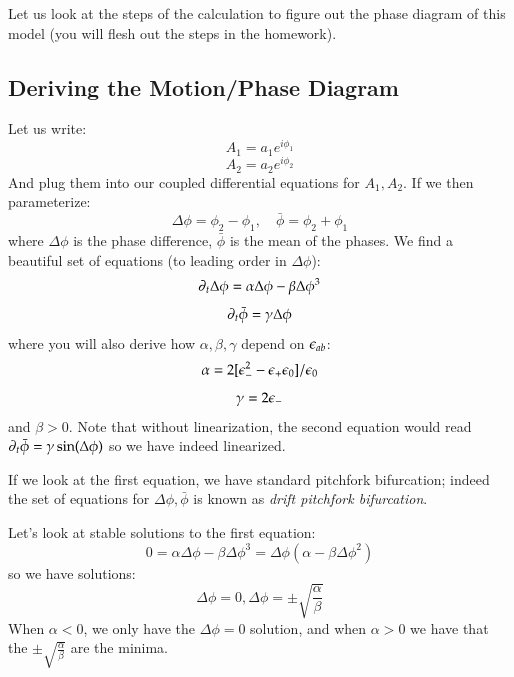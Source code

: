 Let us look at the steps of the calculation to figure out the phase diagram of this model (you will flesh out the steps in the homework).

\subsection{Deriving the Motion/Phase Diagram}
Let us write:
\begin{equation}
    A_1 = a_1e^{i\phi_1}
\end{equation}
\begin{equation}
    A_2 = a_2e^{i\phi_2}
\end{equation}
And plug them into our coupled differential equations for $A_1, A_2$. If we then parameterize:
\begin{equation}
    \Delta \phi = \phi_2 - \phi_1,\quad \bar{\phi} = \phi_2 + \phi_1
\end{equation}
where $\Delta \phi$ is the phase difference, $\bar{\phi}$ is the mean of the phases. We find a beautiful set of equations (to leading order in $\Delta \phi$):
\begin{equation}
    \partial_t \Delta \phi = \alpha \Delta \phi - \beta \Delta \phi^3
\end{equation}
\begin{equation}
    \partial_t \bar{\phi} = \gamma \Delta \phi
\end{equation}
where you will also derive how $\alpha, \beta, \gamma$ depend on $\epsilon_{ab}$:
\begin{equation}
    \alpha = 2[\epsilon_-^2 - \epsilon_+\epsilon_0]/\epsilon_0
\end{equation}
\begin{equation}
    \gamma = 2\epsilon_-
\end{equation}
and $\beta > 0$. Note that without linearization, the second equation would read $\partial_t \bar{\phi} = \gamma \sin(\Delta \phi)$ so we have indeed linearized. 

If we look at the first equation, we have standard pitchfork bifurcation; indeed the set of equations for $\Delta \phi, \bar{\phi}$ is known as \emph{drift pitchfork bifurcation}.

Let's look at stable solutions to the first equation:
\begin{equation}
    0  = \alpha\Delta \phi - \beta \Delta \phi^3 = \Delta\phi(\alpha - \beta\Delta \phi^2)
\end{equation}
so we have solutions:
\begin{equation}
    \Delta \phi = 0, \Delta \phi = \pm\sqrt{\frac{\alpha}{\beta}}
\end{equation}
When $\alpha < 0$, we only have the $\Delta \phi = 0$ solution, and when $\alpha > 0$ we have that the $\pm\sqrt{\frac{\alpha}{\beta}}$ are the minima.


